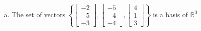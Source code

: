 \begin{exerciseAnswer}
\begin{enumerate}[(a)]
\item The set of vectors \( \left\{ \left[\begin{array}{c}
-2 \\
-5 \\
-3
\end{array}\right] , \left[\begin{array}{c}
-5 \\
-4 \\
-4
\end{array}\right] , \left[\begin{array}{c}
4 \\
1 \\
3
\end{array}\right] \right\} \) is a basis of \(\mathbb{R}^3\)
\end{enumerate}
    
\end{exerciseAnswer}
    

